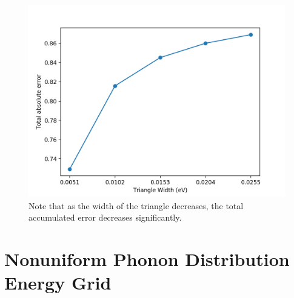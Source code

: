\documentclass[Master.tex]{subfiles}
\begin{document}
    \begin{figure}[h]
      \begin{center}
        \includegraphics[scale=0.6]{diff_widths_total_error}
        \caption{Note that as the width of the triangle decreases, the total accumulated error decreases significantly.}
        \label{fig:diff_widths_total_error}
      \end{center}
    \end{figure}






          \clearpage
\section{Nonuniform Phonon Distribution Energy Grid}
\end{document}
